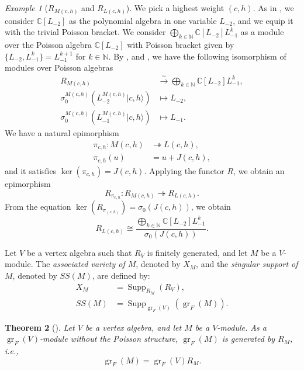 \documentclass[a4paper, 12pt, reqno]{amsart}
\newtheorem{theorem}{Theorem}[section]
\theoremstyle{remark}
\newtheorem{example}[theorem]{Example}
\DeclareMathOperator{\gr}{gr}
\DeclareMathOperator{\Supp}{Supp}
\begin{document}
\begin{example}[$R_{M(c, h)}$ and $R_{L(c, h)}$]
  \label{exa:21}
  We pick a highest weight $(c, h)$.
  As in , we consider $\mathbb{C}[L_{-2}]$ as the polynomial algebra in one variable $L_{-2}$, and we equip it with the trivial Poisson bracket.
  We consider $\bigoplus_{k \in \mathbb{N}}\mathbb{C}[L_{-2}]L_{-1}^k$ as a module over the Poisson algebra $\mathbb{C}[L_{-2}]$ with Poisson bracket given by $\{L_{-2}, L_{-1}^k\} = L_{-1}^{k + 1}$ for $k \in \mathbb{N}$.
  By ,  and , we have the following isomorphism of modules over Poisson algebras
  \begin{align*}
    R_{M(c, h)} &\xrightarrow{\sim} \bigoplus_{k \in \mathbb{N}}\mathbb{C}[L_{-2}]L_{-1}^k, \\
    \sigma^{M(c, h)}_0(L^{M(c, h)}_{-2}|c, h\rangle) &\mapsto L_{-2}, \\
    \sigma^{M(c, h)}_0(L^{M(c, h)}_{-1}|c, h\rangle) &\mapsto L_{-1}.
  \end{align*}
  We have a natural epimorphism
  \begin{align*}
    \pi_{c, h}: M(c, h) &\twoheadrightarrow L(c, h), \\
    \pi_{c, h}(u) &= u + J(c, h),
  \end{align*}
  and it satisfies $\ker(\pi_{c, h}) = J(c, h)$.
  Applying the functor $R$, we obtain an epimorphism
  \begin{equation*}
    R_{\pi_{c, h}}: R_{M(c, h)} \twoheadrightarrow R_{L(c, h)}.
  \end{equation*}
  From the equation $\ker(R_{\pi_{(c, h)}}) = \sigma_0(J(c, h))$, we obtain
  \begin{equation*}
    R_{L(c, h)} \cong \frac{\bigoplus_{k \in \mathbb{N}}\mathbb{C}[L_{-2}]L_{-1}^k}{\sigma_0(J(c, h))}.
  \end{equation*}
\end{example}

Let $V$ be a vertex algebra such that $R_V$ is finitely generated, and let $M$ be a $V$-module.
The \emph{associated variety of $M$}, denoted by $X_M$, and the \emph{singular support of $M$}, denoted by $SS(M)$, are defined by:
\begin{align*}
  X_M &= \Supp_{R_M}(R_V), \\
  SS(M) &= \Supp_{\gr_F(V)}(\gr_F(M)).
\end{align*}

\begin{theorem}[{\cite[Lemma 4.2]{li_abelianizing_2005}}]
  \label{thr:59}
  Let $V$ be a vertex algebra, and let $M$ be a $V$-module.
  As a $\gr_F(V)$-module without the Poisson structure, $\gr_F(M)$ is generated by $R_M$, i.e.,
  \begin{equation*}
    \gr_F(M) = \gr_F(V)R_M.
  \end{equation*}
\end{theorem}
\end{document}
